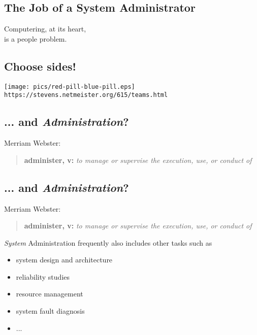 \documentclass[xga]{xdvislides}
\begin{document}
\subsection{The Job of a System Administrator}
\Huge
\vspace*{\fill}
\begin{center}
Computering, at its heart,\\
is a people problem.
\end{center}
\vspace*{\fill}
\Normalsize

\subsection{Choose sides!} \vspace*{\fill}
\begin{center}
\texttt{[image: pics/red-pill-blue-pill.eps]}
\\
\verb+https://stevens.netmeister.org/615/teams.html+
\end{center} \vspace*{\fill}


\subsection{... and {\em Administration}?}
Merriam Webster:
\begin{quote}
	{\bf administer, v:} {\em to manage or supervise the execution, use, or conduct of} \\
\end{quote}

\subsection{... and {\em Administration}?}
Merriam Webster:
\begin{quote}
	{\bf administer, v:} {\em to manage or supervise the execution, use, or conduct of} \\
\end{quote}

{\em System} Administration frequently also includes other tasks such as
\begin{itemize}
	\item system design and architecture
	\item reliability studies
	\item resource management
	\item system fault diagnosis
	\item ...
\end{itemize}
\vspace{.5in}
\end{document}
